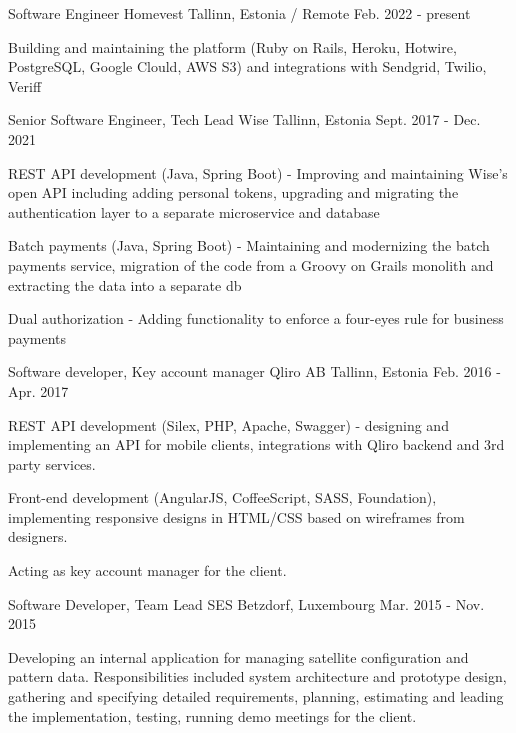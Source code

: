 \begin{cventries}
  \cventry
  {Software Engineer}
  {Homevest}
  {Tallinn, Estonia / Remote}
  {Feb. 2022 - present}
  {
    \begin{cvitems}
      \item { Building and maintaining the platform (Ruby on Rails, Heroku, Hotwire, PostgreSQL, Google Clould, AWS S3) and integrations with Sendgrid, Twilio, Veriff }
    \end{cvitems}
  }
  \cventry
  {Senior Software Engineer, Tech Lead}
  {Wise}
  {Tallinn, Estonia}
  {Sept. 2017 - Dec. 2021}
  {
    \begin{cvitems}
      \item { REST API development (Java, Spring Boot) - Improving and maintaining Wise's open API including adding personal tokens, upgrading and migrating the authentication layer to a separate microservice and database}
      \item { Batch payments (Java, Spring Boot) - Maintaining and modernizing the batch payments service, migration of the code from a Groovy on Grails monolith and extracting the data into a separate db}
      \item { Dual authorization - Adding functionality to enforce a four-eyes rule for business payments }
    \end{cvitems}
  }
  \cventry
  {Software developer, Key account manager}
  {Qliro AB}
  {Tallinn, Estonia}
  {Feb. 2016 - Apr. 2017}
  {
    \begin{cvitems}
      \item { REST API development (Silex, PHP, Apache, Swagger) - designing and implementing an API for mobile clients, integrations with Qliro backend and 3rd party services.}
      \item { Front-end development (AngularJS, CoffeeScript, SASS, Foundation), implementing responsive designs in HTML/CSS based on wireframes from designers.}
      \item { Acting as key account manager for the client.}
    \end{cvitems}
  }
  \cventry
  {Software Developer, Team Lead}
  {SES}
  {Betzdorf, Luxembourg}
  {Mar. 2015 - Nov. 2015}
  {
    \begin{cvitems}
      \item {Developing an internal application for managing satellite configuration and pattern data. Responsibilities included system architecture and prototype design, gathering and specifying detailed requirements, planning, estimating and leading the implementation, testing, running demo meetings for the client.}

\end{cvitems}}
\end{cventries}
